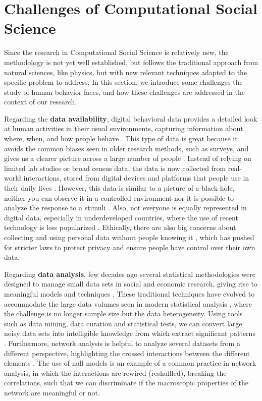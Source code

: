 \section{\label{sec:Challenges of Computational Social Science} Challenges of Computational Social Science}

Since the research in Computational Social Science is relatively new, the methodology is not yet well established, but follows the traditional approach from natural sciences, like physics, but with new relevant techniques adapted to the specific problem to address. In this section, we introduce some challenges the study of human behavior faces, and how these challenges are addressed in the context of our research.

Regarding the \textbf{data availability}, digital behavioral data provides a detailed look at human activities in their usual environments, capturing information about where, when, and how people behave \cite{Eagle2006RealityMining}. This type of data is great because it avoids the common biases seen in older research methods, such as surveys, and gives us a clearer picture across a large number of people \cite{Lazer2009CompSocSci,chen-2014}. Instead of relying on limited lab studies or broad census data, the data is now collected from real-world interactions, stored from digital devices and platforms that people use in their daily lives \cite{Eckmann2004Entropy,blondel-2015,artime-2017}. However, this data is similar to a picture of a black hole, neither you can observe it in a controlled environment nor it is possible to analyze the response to a stimuli \cite{lazer-2014}. Also, not everyone is equally represented in digital data, especially in underdeveloped countries, where the use of recent technology is less popularized \cite{zook-2017}. Ethically, there are also big concerns about collecting and using personal data without people knowing it \cite{boyd-2012, de-montjoye-2013}, which has pushed for stricter laws to protect privacy and ensure people have control over their own data.

Regarding  \textbf{data analysis}, few decades ago several statistical methodologies were designed to manage small data sets in social and economic research, giving rise to meaningful models and techniques \cite{stevens-2012, gelman-2006}. These traditional techniques have evolved to accommodate the large data volumes seen in modern statistical analysis \cite{hastie-2013}, where the challenge is no longer sample size but the data heterogeneity. Using tools such as data mining, data curation and statistical tests, we can convert large noisy data sets into intelligible knowledge from which extract significant patterns \cite{witten-2005}. Furthermore, network analysis is helpful to analyze several datasets from a different perspective, highlighting the crossed interactions between the different elements \cite{newman-book, clauset-2008}. The use of null models \cite{perry2012null,gauvin-2022} is an example of a common practice in network analysis, in which the interactions are rewired (reshuffled), breaking the correlations, such that we can discriminate if the macroscopic properties of the network are meaningful or not.

